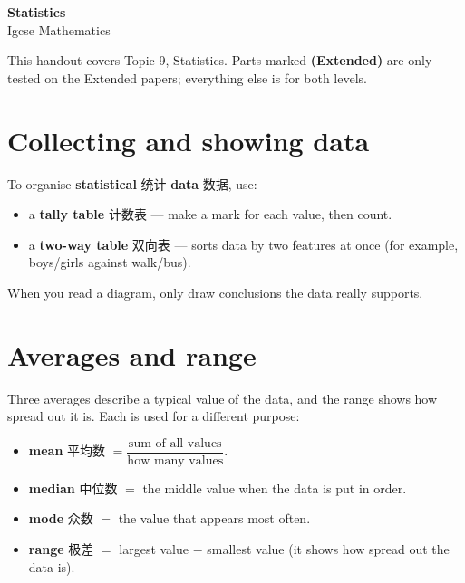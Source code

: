 \documentclass[11pt]{article}
\begin{document}
\begin{center}
  {\LARGE\bfseries Statistics}\\[0.35em]
  {\large Igcse Mathematics}
\end{center}
\vspace{0.6em}

This handout covers Topic 9, Statistics. Parts marked \textbf{(Extended)} are only tested on the Extended papers; everything else is for both levels.

\section*{Collecting and showing data}

To organise \textbf{statistical} 统计 \textbf{data} 数据, use:

\begin{itemize}
\item a \textbf{tally table} 计数表 — make a mark for each value, then count.

\item a \textbf{two-way table} 双向表 — sorts data by two features at once (for example, boys/girls against walk/bus).

\end{itemize}

When you read a diagram, only draw conclusions the data really supports.

\section*{Averages and range}

Three averages describe a typical value of the data, and the range shows how spread out it is. Each is used for a different purpose:

\begin{itemize}
\item \textbf{mean} 平均数 $= \dfrac{\text{sum of all values}}{\text{how many values}}$.

\item \textbf{median} 中位数 $=$ the middle value when the data is put in order.

\item \textbf{mode} 众数 $=$ the value that appears most often.

\item \textbf{range} 极差 $=$ largest value $-$ smallest value (it shows how spread out the data is).

\end{itemize}
\end{document}
